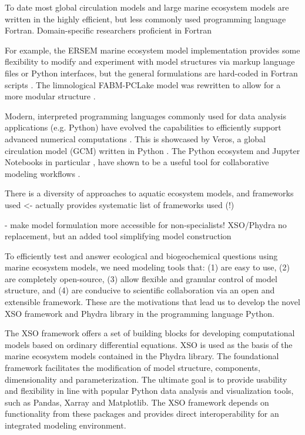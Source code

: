 \documentclass[journal abbreviation, manuscript]{copernicus}
\begin{document}
To date most global circulation models and large marine ecosystem models are written in the highly efficient, but less commonly used programming language Fortran. Domain-specific researchers proficient in Fortran 

For example, the ERSEM marine ecosystem model implementation provides some flexibility to modify and experiment with model structures via markup language files or Python interfaces, but the general formulations are hard-coded in Fortran scripts \citep{Butenschon2016}. The limnological FABM-PCLake model was rewritten to allow for a more modular structure \citep[][]{Schnedler-Meyer2022WaterModel}. 

Modern, interpreted programming languages commonly used for data analysis applications (e.g. Python) have evolved the capabilities to efficiently support advanced numerical computations \citep{Lin2012}. This is showcased by Veros, a global circulation model (GCM) written in Python \citep{Hafner2018VerosPython}. The Python ecosystem and Jupyter Notebooks in particular \citep{Kluyver2016JupyterWorkflows}, have shown to be a useful tool for collaborative modeling workflows \citep[e.g. eWaterCycle platform,][]{Hut2022TheCollaboration}. 

There is a diversity of approaches to aquatic ecosystem models, and frameworks used
\citep{Janssen2015ExploringPerspective} <- actually provides systematic list of frameworks used (!)

- make model formulation more accessible for non-specialists! XSO/Phydra no replacement, but an added tool simplifying model construction




To efficiently test and answer ecological and biogeochemical questions using marine ecosystem models, we need modeling tools that: (1) are easy to use, (2) are completely open-source, (3) allow flexible and granular control of model structure, and (4) are conducive to scientific collaboration via an open and extensible framework. These are the motivations that lead us to develop the novel XSO framework and Phydra library in the programming language Python. 

The XSO framework offers a set of building blocks for developing computational models based on ordinary differential equations. XSO is used as the basis of the marine ecosystem models contained in the Phydra library. The foundational framework facilitates the modification of model structure, components, dimensionality and parameterization. The ultimate goal is to provide usability and flexibility in line with popular Python data analysis and visualization tools, such as Pandas, Xarray and Matplotlib. The XSO framework depends on functionality from these packages and provides direct interoperability for an integrated modeling environment.
\end{document}
